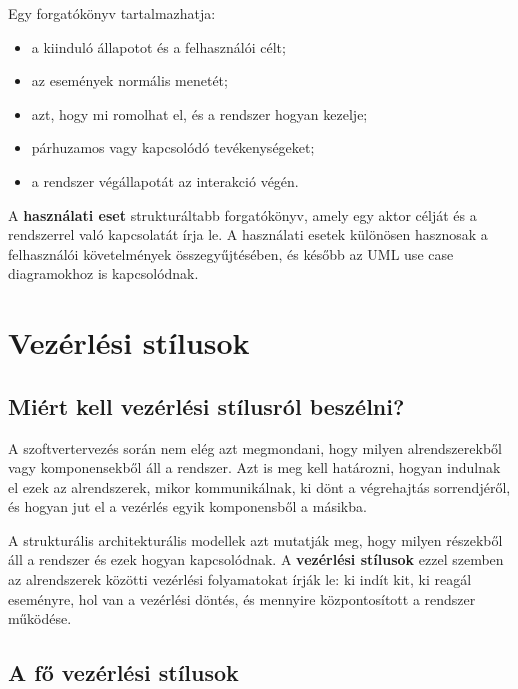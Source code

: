 Egy forgatókönyv tartalmazhatja:

\begin{itemize}
  \item a kiinduló állapotot és a felhasználói célt;
  \item az események normális menetét;
  \item azt, hogy mi romolhat el, és a rendszer hogyan kezelje;
  \item párhuzamos vagy kapcsolódó tevékenységeket;
  \item a rendszer végállapotát az interakció végén.
\end{itemize}

A \textbf{használati eset} strukturáltabb forgatókönyv, amely egy aktor célját és a rendszerrel való kapcsolatát írja le. A használati esetek különösen hasznosak a felhasználói követelmények összegyűjtésében, és később az UML use case diagramokhoz is kapcsolódnak.

\section{Vezérlési stílusok}

\subsection{Miért kell vezérlési stílusról beszélni?}

A szoftvertervezés során nem elég azt megmondani, hogy milyen alrendszerekből vagy komponensekből áll a rendszer. Azt is meg kell határozni, hogyan indulnak el ezek az alrendszerek, mikor kommunikálnak, ki dönt a végrehajtás sorrendjéről, és hogyan jut el a vezérlés egyik komponensből a másikba.

A strukturális architekturális modellek azt mutatják meg, hogy milyen részekből áll a rendszer és ezek hogyan kapcsolódnak. A \textbf{vezérlési stílusok} ezzel szemben az alrendszerek közötti vezérlési folyamatokat írják le: ki indít kit, ki reagál eseményre, hol van a vezérlési döntés, és mennyire központosított a rendszer működése.



\subsection{A fő vezérlési stílusok}

\begin{center}

\end{center}


